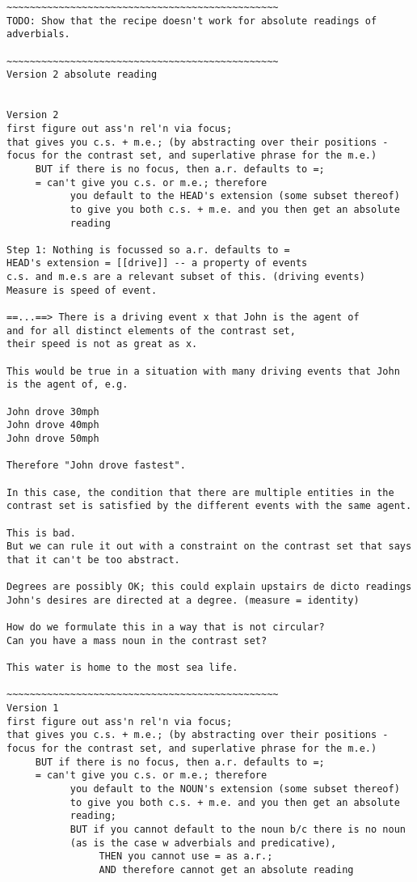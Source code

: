 \documentclass{article}
\begin{document}
\begin{verbatim}
~~~~~~~~~~~~~~~~~~~~~~~~~~~~~~~~~~~~~~~~~~~~~~~
TODO: Show that the recipe doesn't work for absolute readings of
adverbials.

~~~~~~~~~~~~~~~~~~~~~~~~~~~~~~~~~~~~~~~~~~~~~~~
Version 2 absolute reading


Version 2
first figure out ass'n rel'n via focus;
that gives you c.s. + m.e.; (by abstracting over their positions -
focus for the contrast set, and superlative phrase for the m.e.) 
     BUT if there is no focus, then a.r. defaults to =;
     = can't give you c.s. or m.e.; therefore
           you default to the HEAD's extension (some subset thereof)
           to give you both c.s. + m.e. and you then get an absolute
           reading

Step 1: Nothing is focussed so a.r. defaults to =
HEAD's extension = [[drive]] -- a property of events
c.s. and m.e.s are a relevant subset of this. (driving events)
Measure is speed of event.

==...==> There is a driving event x that John is the agent of
and for all distinct elements of the contrast set, 
their speed is not as great as x.

This would be true in a situation with many driving events that John
is the agent of, e.g.

John drove 30mph
John drove 40mph
John drove 50mph

Therefore "John drove fastest".

In this case, the condition that there are multiple entities in the
contrast set is satisfied by the different events with the same agent.

This is bad.
But we can rule it out with a constraint on the contrast set that says
that it can't be too abstract.

Degrees are possibly OK; this could explain upstairs de dicto readings
John's desires are directed at a degree. (measure = identity)

How do we formulate this in a way that is not circular?
Can you have a mass noun in the contrast set?

This water is home to the most sea life.

~~~~~~~~~~~~~~~~~~~~~~~~~~~~~~~~~~~~~~~~~~~~~~~
Version 1
first figure out ass'n rel'n via focus;
that gives you c.s. + m.e.; (by abstracting over their positions -
focus for the contrast set, and superlative phrase for the m.e.) 
     BUT if there is no focus, then a.r. defaults to =;
     = can't give you c.s. or m.e.; therefore
           you default to the NOUN's extension (some subset thereof)
           to give you both c.s. + m.e. and you then get an absolute
           reading;
           BUT if you cannot default to the noun b/c there is no noun
           (as is the case w adverbials and predicative),
                THEN you cannot use = as a.r.; 
                AND therefore cannot get an absolute reading


\end{verbatim}
\end{document}
